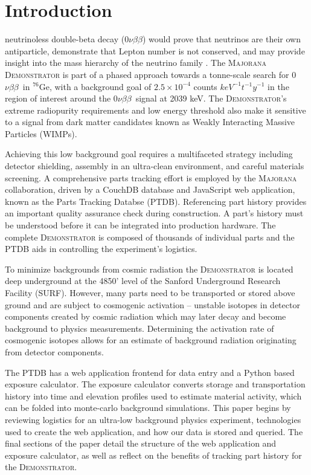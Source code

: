 \documentclass[journal]{IEEEtran}
\def\znbb{0$\nu\beta\beta$}
\def\ge76{$^{76}$Ge}
\begin{document}
\section{Introduction}
 neutrinoless double-beta decay (\znbb) would prove that neutrinos are their own antiparticle,
demonstrate that Lepton number is not conserved, and may provide insight into
the mass hierarchy of the neutrino family \cite{phillips_mj} \cite{mj_wilkerson} \cite{avignone_neutrinos}.
The \textsc{Majorana Demonstrator} is part of a phased approach towards a tonne-scale search for \znbb\ in \ge76, with
a background goal of $2.5\times10^{-4}$ counts $keV^{-1} t^{-1} y^{-1}$ \cite{mj_wilkerson} in the region of interest
around the \znbb\ signal at 2039 keV.
The \textsc{Demonstrator}'s extreme radiopurity requirements and low energy threshold also make it sensitive to a signal from dark
matter candidates known as Weakly Interacting Massive Particles (WIMPs).

Achieving this low background goal requires a multifaceted strategy including detector shielding, assembly in an ultra-clean environment,
and careful materials screening. A comprehensive parts tracking effort is employed by the \textsc{Majorana} collaboration, driven by a
CouchDB  \cite{couchdb_guide} database and JavaScript web application, known as the Parts Tracking Databse (PTDB).
Referencing part history provides an important quality assurance check during 
construction. A part's history must be 
understood before it can be integrated into production hardware. 
The complete \textsc{Demonstrator} is composed of thousands of individual parts and the PTDB aids in controlling the experiment's logistics.

To minimize backgrounds from cosmic radiation the \textsc{Demonstrator} is located deep underground
at the 4850' level of the Sanford Underground Research Facility (SURF).
However, many parts need to be transported or stored above ground and are subject to
cosmogenic activation -- unstable isotopes in detector components created by cosmic radiation which may later decay and become background
to physics measurements.
Determining the activation rate of cosmogenic isotopes allows for an estimate of background
radiation originating from detector components.

The PTDB has a web application frontend
for data entry and a Python based exposure calculator. The exposure calculator converts storage and transportation history 
into time and elevation profiles used to estimate
material activity, which can be folded into monte-carlo background simulations.
This paper begins by reviewing logistics for an ultra-low background
physics experiment, technologies used to create the web application, and
how our data is stored and queried. The final sections of the paper detail
the structure of the web application and exposure calculator, as well as reflect
on the benefits of tracking part history for the \textsc{Demonstrator}.
\end{document}
